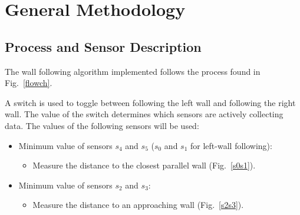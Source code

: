 \section{General Methodology}

\subsection{Process and Sensor Description}

The wall following algorithm implemented follows the process found in
Fig.~\ref{flowch}. 

\begin{figure}[h!]
  \centering \cprotect {}
\end{figure}

A switch is used to toggle between following the left wall and
following the right wall. The value of the switch determines which sensors are actively
collecting data. The values of the following sensors will be used:

\begin{itemize}
\item Minimum value of sensors \(s_4\) and \(s_5\) (\(s_0\) and
  \(s_1\) for left-wall following):
  \begin{itemize}
  \item Measure the distance to the closest parallel wall
    (Fig.~\ref{s0s1}).
  \end{itemize}
\item Minimum value of sensors \(s_2\) and \(s_3\):
  \begin{itemize}
  \item Measure the distance to an approaching wall (Fig.~\ref{s2s3}).
  \end{itemize}
\end{itemize}

